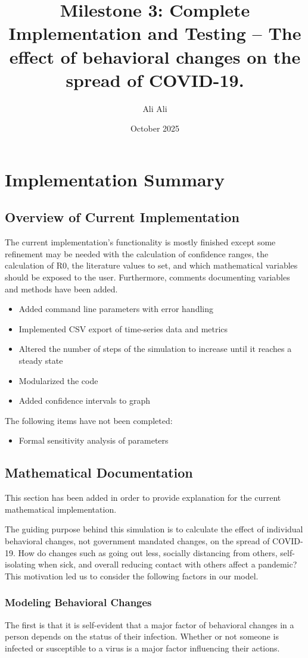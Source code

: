 \documentclass{article}
\title{Milestone 3: Complete Implementation and Testing -- The effect of behavioral changes on the spread of COVID-19.}
\author{Ali Ali}
\date{October 2025}
\begin{document}
\maketitle
\section{Implementation Summary}
\subsection{Overview of Current Implementation}
The current implementation's functionality is mostly finished except some refinement may be needed with the calculation of confidence ranges, the calculation of R0, the literature values to set, and which mathematical variables should be exposed to the user. Furthermore, comments documenting variables and methods have been added.
\begin{itemize}
\item Added command line parameters with error handling
\item Implemented CSV export of time-series data and metrics
\item Altered the number of steps of the simulation to increase until it reaches a steady state
\item Modularized the code
\item Added confidence intervals to graph
\end{itemize}
The following items have not been completed:
\begin{itemize}
\item Formal sensitivity analysis of parameters
\end{itemize}
\subsection{Mathematical Documentation}
This section has been added in order to provide explanation for the current mathematical implementation.

The guiding purpose behind this simulation is to calculate the effect of individual behavioral changes, not government mandated changes, on the spread of COVID-19. How do changes such as going out less, socially distancing from others, self-isolating when sick, and overall reducing contact with others affect a pandemic? This motivation led us to consider the following factors in our model.

\subsubsection{Modeling Behavioral Changes}
The first is that it is self-evident that a major factor of behavioral changes in a person depends on the status of their infection. Whether or not someone is infected or susceptible to a virus is a major factor influencing their actions.
\end{document}
